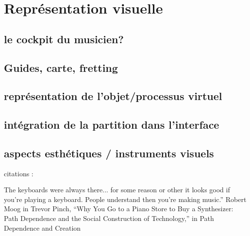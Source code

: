 %
\chapter{Représentation visuelle}
\label{ch:visual_representation}



\section{le cockpit du musicien?}
\label{sec:visual_representation:sec1}

\section{Guides, carte, fretting}

\section{représentation de l'objet/processus virtuel}

\section{intégration de la partition dans l'interface}

\section{aspects esthétiques / instruments visuels}


citations :

The  keyboards  were  always  there...  for  some  reason  or  other  it  looks  good  if  you’re playing a keyboard. People understand then you’re making music.” Robert Moog in Trevor Pinch, “Why You Go to a Piano Store to Buy a Synthesizer: Path Dependence and the Social Construction of Technology,” in Path Dependence and Creation